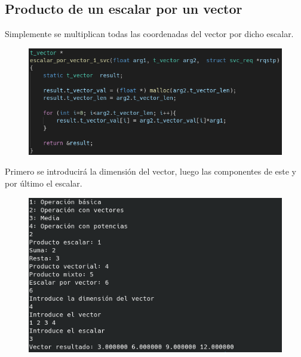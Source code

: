 \documentclass{article}
\begin{document}
	\subsection{Producto de un escalar por un vector}
	Simplemente se multiplican todas las coordenadas del vector por dicho escalar.
	\begin{figure}[H]
		\centering
		\includegraphics[totalheight=5cm]{img/17.png}
	\end{figure}
	Primero se introducirá la dimensión del vector, luego las componentes de este y por último el escalar.
	\begin{figure}[H]
		\centering
		\includegraphics[totalheight=7.5cm]{img/18.png}
	\end{figure}
\end{document}
